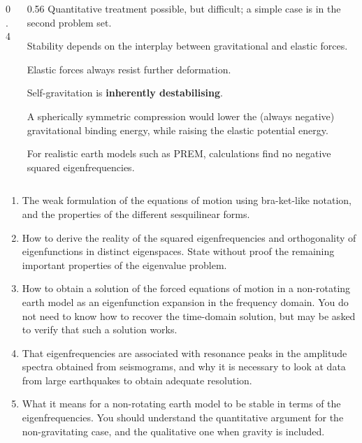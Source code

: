 \documentclass[14pt]{beamer}
\begin{document}
\begin{frame}
\begin{columns}[c]
\begin{column}{0.4\textwidth}
\centering
{}
\end{column}
\begin{column}{0.56\textwidth}
\setlength{\parskip}{0.8em}%
Quantitative treatment possible, but difficult; a simple case is in the second problem set.

Stability depends on the interplay between gravitational and elastic forces.

Elastic forces always resist further deformation.

Self-gravitation is \textbf{inherently destabilising}.

A spherically symmetric compression would lower the (always negative) gravitational binding energy, while
raising the elastic potential energy.

For realistic earth models such as PREM, calculations find no negative squared eigenfrequencies.
\end{column}
\end{columns}
\end{frame}

\begin{frame}[t]
\begin{enumerate}
\item[(i)] The weak formulation of the equations of motion using bra-ket-like notation, and the properties of the
different sesquilinear forms.
\item[(ii)] How to derive the reality of the squared eigenfrequencies and orthogonality of eigenfunctions in distinct
eigenspaces. State without proof the remaining important properties of the eigenvalue problem.
\item[(iii)] How to obtain a solution of the forced equations of motion in a non-rotating earth model as an
eigenfunction expansion in the frequency domain. You do not need to know how to recover the time-domain solution, but
may be asked to verify that such a solution works.
\item[(iv)] That eigenfrequencies are associated with resonance peaks in the amplitude spectra obtained from
seismograms, and why it is necessary to look at data from large earthquakes to obtain adequate resolution.
\item[(v)] What it means for a non-rotating earth model to be stable in terms of the eigenfrequencies. You should
understand the quantitative argument for the non-gravitating case, and the qualitative one when gravity is included.
\end{enumerate}
\end{frame}
\end{document}
